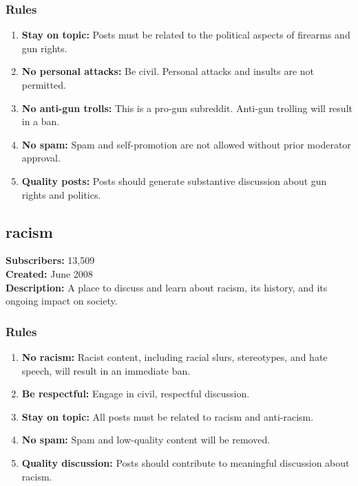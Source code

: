 \subsubsection{Rules}
\begin{enumerate}
    \item \textbf{Stay on topic:} Posts must be related to the political aspects of firearms and gun rights.
    
    \item \textbf{No personal attacks:} Be civil. Personal attacks and insults are not permitted.
    
    \item \textbf{No anti-gun trolls:} This is a pro-gun subreddit. Anti-gun trolling will result in a ban.
    
    \item \textbf{No spam:} Spam and self-promotion are not allowed without prior moderator approval.
    
    \item \textbf{Quality posts:} Posts should generate substantive discussion about gun rights and politics.
\end{enumerate}

\subsection{racism}
\textbf{Subscribers:} 13,509 \\
\textbf{Created:} June 2008 \\
\textbf{Description:} A place to discuss and learn about racism, its history, and its ongoing impact on society.

\subsubsection{Rules}
\begin{enumerate}
    \item \textbf{No racism:} Racist content, including racial slurs, stereotypes, and hate speech, will result in an immediate ban.
    
    \item \textbf{Be respectful:} Engage in civil, respectful discussion.
    
    \item \textbf{Stay on topic:} All posts must be related to racism and anti-racism.
    
    \item \textbf{No spam:} Spam and low-quality content will be removed.
    
    \item \textbf{Quality discussion:} Posts should contribute to meaningful discussion about racism.
\end{enumerate}

